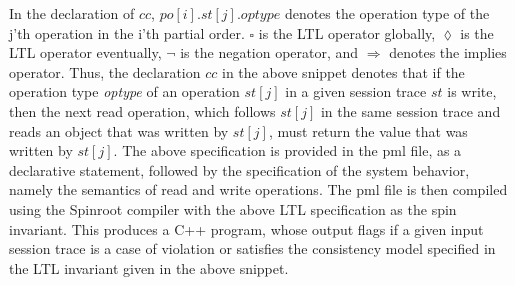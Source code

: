 \documentclass[journal, compsoc]{IEEEtran}
\begin{document}
	In the declaration of $\mathit{cc}$, $\mathit{po}[i]. \mathit{st}[j].\mathit{optype}$ denotes the operation type of the j'th operation in the i'th partial order. $\square$ is the LTL operator globally, $\lozenge$ is the LTL operator eventually, $\lnot$ is the negation operator, and   $\Rightarrow$ denotes the implies operator.  Thus, the declaration $cc$ in  the above snippet %
	denotes that if the operation type \emph{optype} of an operation $st[j]$ in a given session trace $st$ is write, then the next read operation, which follows $st[j]$ in the same session trace and reads an  object that was written by $st[j]$, must return the value that was written by $st[j]$.
	The above specification is provided in the pml file, as a declarative statement, followed by the specification of the system behavior, namely the semantics of read and write operations. 
	The pml file is then compiled using the Spinroot compiler with the above LTL specification as the spin invariant. 
	This produces a C++ program, whose output flags if a given input session trace is a case of violation or satisfies the consistency model specified in the LTL invariant given in  the above snippet. %
\end{document}
